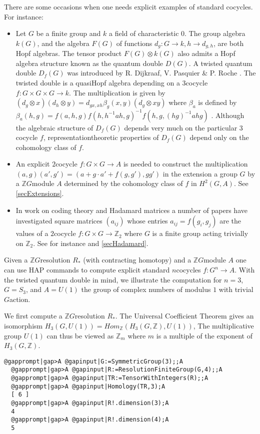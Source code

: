 \documentclass[a4paper,11pt]{report}
\begin{document}
{{ There are some occasions when one needs explicit examples of standard
cocycles. For instance: 
\begin{itemize}
\item  Let $G$ be a finite group and $k$ a field of characteristic $0$. The group algebra $k(G)$, and the algebra $F(G)$ of functions $d_g\colon G\rightarrow k, h\rightarrow d_{g,h}$, are both Hopf algebras. The tensor product $F(G) \otimes k(G)$ also admits a Hopf algebra structure known as the quantum double $D(G)$. A twisted quantum double $D_f(G)$ was introduced by R. Dijkraaf, V. Pasquier \& P. Roche \cite{dpr}. The twisted double is a quasi\texttt{}Hopf algebra depending on a $3$\texttt{}cocycle $f\colon G\times G\times G\rightarrow k$. The multiplication is given by $(d_g \otimes x)(d_h \otimes y) = d_{gx,xh}\beta_g(x,y)(d_g \otimes xy)$ where $\beta_a $ is defined by $\beta_a(h,g) = f(a,h,g) f(h,h^{-1}ah,g)^{-1} f(h,g,(hg)^{-1}ahg)$ . Although the algebraic structure of $D_f(G)$ depends very much on the particular $3$\texttt{}cocycle $f$, representation\texttt{}theoretic properties of $D_f(G)$ depend only on the cohomology class of $f$. 
\item  An explicit $2$\texttt{}cocycle $f\colon G\times G\rightarrow A$ is needed to construct the multiplication $(a,g)(a',g') = (a + g\cdot a' + f(g,g'), gg')$ in the extension a group $G$ by a $\mathbb ZG$\texttt{}module $A$ determined by the cohomology class of $f$ in $H^2(G,A)$. See \ref{secExtensions}. 
\item  In work on coding theory and Hadamard matrices a number of papers have
investigated square matrices $(a_{ij})$ whose entries $a_{ij}=f(g_i,g_j)$ are the values of a $2$\texttt{}cocycle $f\colon G\times G \rightarrow \mathbb Z_2$ where $G$ is a finite group acting trivially on $\mathbb Z_2$. See for instance \cite{horadam} and \ref{secHadamard}. 
\end{itemize}
 

 Given a $\mathbb ZG$\texttt{}resolution $R_\ast$ (with contracting homotopy) and a $\mathbb ZG$\texttt{}module $A$ one can use HAP commands to compute explicit standard $n$\texttt{}cocycles $f\colon G^n \rightarrow A$. With the twisted quantum double in mind, we illustrate the computation for $n=3$, $G=S_3$, and $A=U(1)$ the group of complex numbers of modulus $1$ with trivial $G$\texttt{}action. 

 We first compute a $\mathbb ZG$\texttt{}resolution $R_\ast$. The Universal Coefficient Theorem gives an isomorphism $H_3(G,U(1)) = Hom_{\mathbb Z}(H_3(G,\mathbb Z), U(1))$, The multiplicative group $U(1)$ can thus be viewed as $\mathbb Z_m$ where $m$ is a multiple of the exponent of $H_3(G,\mathbb Z)$. 
\begin{Verbatim}[commandchars=@|A,fontsize=\small,frame=single,label=Example]
  @gapprompt|gap>A @gapinput|G:=SymmetricGroup(3);;A
  @gapprompt|gap>A @gapinput|R:=ResolutionFiniteGroup(G,4);;A
  @gapprompt|gap>A @gapinput|TR:=TensorWithIntegers(R);;A
  @gapprompt|gap>A @gapinput|Homology(TR,3);A
  [ 6 ]
  @gapprompt|gap>A @gapinput|R!.dimension(3);A
  4
  @gapprompt|gap>A @gapinput|R!.dimension(4);A
  5
  

\end{Verbatim}}}
\end{document}
